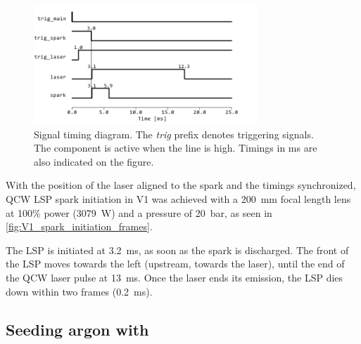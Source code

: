             \begin{figure}[!ht]
                \centering
                \includegraphics[width=0.75\textwidth]{assets/4 experiments/timings.pdf}
                \caption{Signal timing diagram. The \textit{trig} prefix denotes triggering signals. The component is active when the line is high. Timings in \unit{ms} are also indicated on the figure.}
                \label{fig: Signal timing diagram}
            \end{figure}

            With the position of the laser aligned to the spark and the timings synchronized, QCW LSP spark initiation in V1 was achieved with a \qty{200}{mm} focal length lens at 100\% power (\qty{3079}{W}) and a pressure of \qty{20}{bar}, as seen in \autoref{fig:V1_spark_initiation_frames}.
            
            
            
            The LSP is initiated at \qty{3.2}{ms}, as soon as the spark is discharged. The front of the LSP moves towards the left (upstream, towards the laser), until the end of the QCW laser pulse at \qty{13}{ms}. Once the laser ends its emission, the LSP dies down within two frames (\qty{0.2}{ms}).

        \subsection{Seeding argon with }

            
